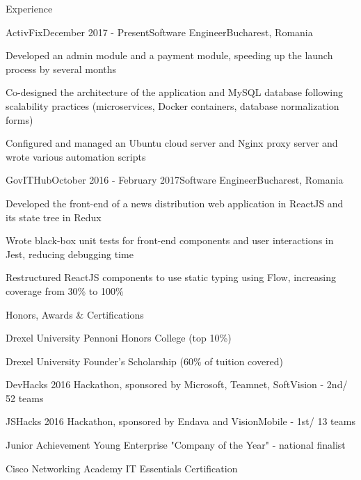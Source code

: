 \documentclass{resume} %
\begin{document}
\begin{rSection}{Experience}

\begin{rSubsection}{ActivFix}{December 2017 - Present}{Software Engineer}{Bucharest, Romania}
\item Developed an admin module and a payment module, speeding up the launch process by several months
\item Co-designed the architecture of the application and MySQL database following scalability practices (microservices, Docker containers, database normalization forms)
\item Configured and managed an Ubuntu cloud server and Nginx proxy server and wrote various automation scripts
\end{rSubsection}


\begin{rSubsection}{GovITHub}{October 2016 - February 2017}{Software Engineer}{Bucharest, Romania}
\item Developed the front-end of a news distribution web application in ReactJS and its state tree in Redux
\item Wrote black-box unit tests for front-end components and user interactions in Jest, reducing debugging time
\item Restructured ReactJS components to use static typing using Flow, increasing coverage from 30\% to 100\%
\end{rSubsection}

\end{rSection}


\begin{rSection}{Honors, Awards \& Certifications}
\begin{rSubsection}{}{}{}{}
\item Drexel University Pennoni Honors College (top 10\%)
\item Drexel University Founder’s Scholarship (60\% of tuition covered)
\item DevHacks 2016 Hackathon, sponsored by Microsoft, Teamnet, SoftVision - 2nd/ 52 teams
\item JSHacks 2016 Hackathon, sponsored by Endava and VisionMobile - 1st/ 13 teams
\item Junior Achievement Young Enterprise "Company of the Year" - national finalist
\item Cisco Networking Academy IT Essentials Certification
\end{rSubsection}
\end{rSection}
\end{document}
